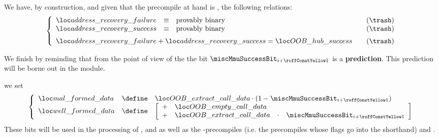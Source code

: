 \begin{description}
\begin{description}
\begin{description}
						\saNote{}
						We have, by construction, and given that the precompile at hand is \instEcrecover{}, the following relations:
						\[
							\left\{ \begin{array}{lclr}
								\locAddressRecoveryFailure   & \equiv & \text{provably binary} & \quad (\trash) \\
								\locAddressRecoverySuccess   & \equiv & \text{provably binary} & \quad (\trash) \vspace{2mm} \\
								\multicolumn{3}{l}{\locAddressRecoveryFailure + \locAddressRecoverySuccess = \locOobResultHubSuccess} & \quad (\trash) \\
							\end{array} \right.
						\]

						\saNote{}\label{hub: instruction handling: call: precompiles: common: generalities: ecrecover recovery reminder that MMU success bit is a prediction}
						We finish by reminding that from the point of view of the \hubMod{}
						the bit $\miscMmuSuccessBit_{i + \prcCommonMiscRowOffset}$ is a \textbf{prediction}.
						This prediction will be borne out in the \ecDataMod{} module.
					\item[\underline{\instEcadd{}, \instEcmul{} and \instEcpairing{} as well as \inst{BLS}-precompile specific:}]
						we set
						\[
							\left\{ \begin{array}{lcl}
								\locMalFormedData  & \define & \locOobResultExtractCallData \cdot (1 - \miscMmuSuccessBit_{i + \prcCommonMiscRowOffset}) \\
								\locWellFormedData & \define & 
								\left[ \begin{array}{clcl}
									+ & \locOobResultEmptyCallData                                        \\
									+ & \locOobResultExtractCallData & \cdot & \miscMmuSuccessBit_{i + \prcCommonMiscRowOffset} \\
								\end{array} \right] \\
							\end{array} \right.
						\]
						\saNote{}
						These bits will be used in the processing of \instEcadd{}, \instEcmul{} and \instEcpairing{}
						as well as the -precompiles (i.e. the precompiles whose flags go into the \scenPrecompileCommonBls{} shorthand) and \instPVerify{}.


\end{description}
\end{description}
\end{description}
